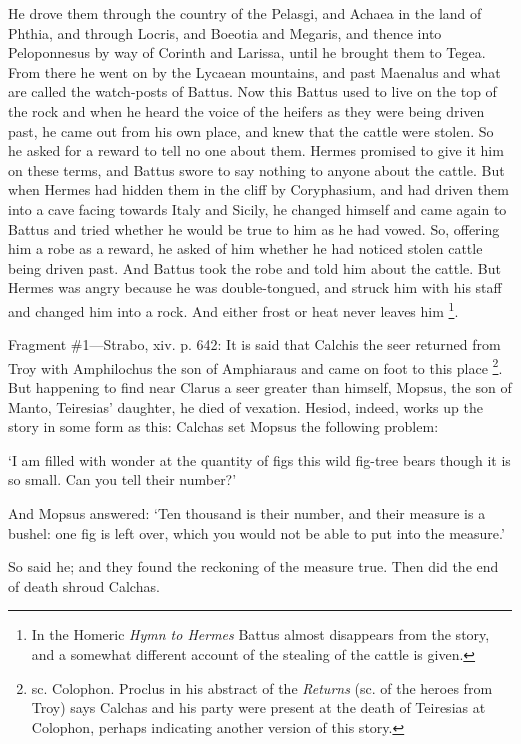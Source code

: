 He drove them through the country of the Pelasgi, and Achaea in the land of
Phthia, and through Locris, and Boeotia and Megaris, and thence into
Peloponnesus by way of Corinth and Larissa, until he brought them to Tegea.
From there he went on by the Lycaean mountains, and past Maenalus and what are
called the watch-posts of Battus. Now this Battus used to live on the top of
the rock and when he heard the voice of the heifers as they were being driven
past, he came out from his own place, and knew that the cattle were stolen. So
he asked for a reward to tell no one about them. Hermes promised to give it him
on these terms, and Battus swore to say nothing to anyone about the cattle. But
when Hermes had hidden them in the cliff by Coryphasium, and had driven them
into a cave facing towards Italy and Sicily, he changed himself and came again
to Battus and tried whether he would be true to him as he had vowed. So,
offering him a robe as a reward, he asked of him whether he had noticed stolen
cattle being driven past. And Battus took the robe and told him about the
cattle. But Hermes was angry because he was double-tongued, and struck him with
his staff and changed him into a rock. And either frost or heat never leaves
him \footnote{In the Homeric \emph{Hymn
to Hermes} Battus almost disappears from the story, and a somewhat
different account of the stealing of the cattle is given.}.


Fragment \#1—Strabo, xiv. p. 642: It is said that Calchis the seer
returned from Troy with Amphilochus the son of Amphiaraus and came on foot to
this place \footnote{sc. Colophon. Proclus in
his abstract of the \emph{Returns} (sc. of the heroes from Troy) says
Calchas and his party were present at the death of Teiresias at Colophon,
perhaps indicating another version of this story.}. But happening to find near
Clarus a seer greater than himself, Mopsus, the son of Manto, Teiresias’
daughter, he died of vexation. Hesiod, indeed, works up the story in some form
as this: Calchas set Mopsus the following problem:

‘I am filled with wonder at the quantity of figs this wild fig-tree bears
though it is so small. Can you tell their number?’

And Mopsus answered: ‘Ten thousand is their number, and their measure is
a bushel: one fig is left over, which you would not be able to put into the
measure.’

So said he; and they found the reckoning of the measure true. Then did the end
of death shroud Calchas.

